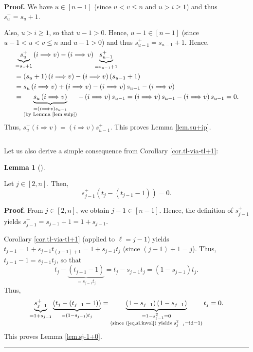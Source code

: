 \documentclass[numbers=enddot,12pt,final,onecolumn,notitlepage]{scrartcl}%
\theoremstyle{definition}
\newtheorem{lem}[theo]{Lemma}
\newenvironment{lemma}[1][]
{\begin{lem}[#1]\begin{leftbar}}
{\end{leftbar}\end{lem}}
\newenvironment{proof}[1][Proof]{\noindent\textbf{#1.} }{\ \rule{0.5em}{0.5em}}
\begin{document}
\begin{proof}
We have $u\in\left[  n-1\right]  $ (since $u<v\leq n$ and $u>i\geq1$) and thus
$s_{u}^{+}=s_{u}+1$.

Also, $u>i\geq1$, so that $u-1>0$. Hence, $u-1\in\left[  n-1\right]  $ (since
$u-1<u<v\leq n$ and $u-1>0$) and thus $s_{u-1}^{+}=s_{u-1}+1$. Hence,%
\begin{align*}
&  \underbrace{s_{u}^{+}}_{=s_{u}+1}\left(  i\Longrightarrow v\right)
-\left(  i\Longrightarrow v\right)  \underbrace{s_{u-1}^{+}}_{=s_{u-1}+1}\\
&  =\left(  s_{u}+1\right)  \left(  i\Longrightarrow v\right)  -\left(
i\Longrightarrow v\right)  \left(  s_{u-1}+1\right) \\
&  =s_{u}\left(  i\Longrightarrow v\right)  +\left(  i\Longrightarrow
v\right)  -\left(  i\Longrightarrow v\right)  s_{u-1}-\left(  i\Longrightarrow
v\right) \\
&  =\underbrace{s_{u}\left(  i\Longrightarrow v\right)  }_{\substack{=\left(
i\Longrightarrow v\right)  s_{u-1}\\\text{(by Lemma \ref{lem.suip})}}}-\left(
i\Longrightarrow v\right)  s_{u-1}=\left(  i\Longrightarrow v\right)
s_{u-1}-\left(  i\Longrightarrow v\right)  s_{u-1}=0.
\end{align*}
Thus, $s_{u}^{+}\left(  i\Longrightarrow v\right)  =\left(  i\Longrightarrow
v\right)  s_{u-1}^{+}$. This proves Lemma \ref{lem.su+ip}.
\end{proof}

Let us also derive a simple consequence from Corollary \ref{cor.tl-via-tl+1}:

\begin{lemma}
\label{lem.sj-1+0}Let $j\in\left[  2,n\right]  $. Then,%
\[
s_{j-1}^{+}\left(  t_{j}-\left(  t_{j-1}-1\right)  \right)  =0.
\]

\end{lemma}

\begin{proof}
From $j\in\left[  2,n\right]  $, we obtain $j-1\in\left[  n-1\right]  $.
Hence, the definition of $s_{j-1}^{+}$ yields $s_{j-1}^{+}=s_{j-1}%
+1=1+s_{j-1}$.

Corollary \ref{cor.tl-via-tl+1} (applied to $\ell=j-1$) yields $t_{j-1}%
=1+s_{j-1}t_{\left(  j-1\right)  +1}=1+s_{j-1}t_{j}$ (since $\left(
j-1\right)  +1=j$). Thus, $t_{j-1}-1=s_{j-1}t_{j}$, so that%
\[
t_{j}-\underbrace{\left(  t_{j-1}-1\right)  }_{=s_{j-1}t_{j}}=t_{j}%
-s_{j-1}t_{j}=\left(  1-s_{j-1}\right)  t_{j}.
\]
Thus,%
\[
\underbrace{s_{j-1}^{+}}_{=1+s_{j-1}}\underbrace{\left(  t_{j}-\left(
t_{j-1}-1\right)  \right)  }_{=\left(  1-s_{j-1}\right)  t_{j}}%
=\underbrace{\left(  1+s_{j-1}\right)  \left(  1-s_{j-1}\right)
}_{\substack{=1-s_{j-1}^{2}=0\\\text{(since (\ref{eq.si.invol}) yields
}s_{j-1}^{2}=\operatorname*{id}=1\text{)}}}t_{j}=0.
\]
This proves Lemma \ref{lem.sj-1+0}.
\end{proof}
\end{document}
